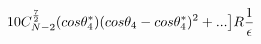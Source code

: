 \begin{equation}
10C_{N-2}^{\frac{7}{2}}(cos{\theta_4^*})(cos\theta_4 - cos\theta_4^*)^2 + ...\big{]}R
\frac{1}{\epsilon} 
\end{equation}

